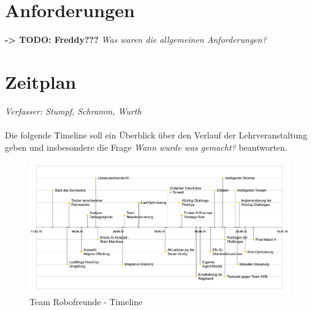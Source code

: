 \documentclass[fontsize=12pt,a4paper,final]{scrartcl}[2003/01/01]
\begin{document}
\section{Anforderungen}
\textbf{-> TODO: Freddy???}
\textit{Was waren die allgemeinen Anforderungen?}
\section{Zeitplan}
\textit{Verfasser: Stumpf, Schramm, Wurth}\\
\\
Die folgende Timeline soll ein Überblick über den Verlauf der Lehrveranstaltung geben und insbesondere die Frage \textit{\glqq Wann wurde was gemacht?\grqq} beantworten.

\begin{figure}[H]
	\centering
	\includegraphics[width=\textwidth]{Grafiken/Timeline_cropped}
	\caption{Team Robofreunde - Timeline}
	\label{fig:Timeline}
\end{figure}
\end{document}
